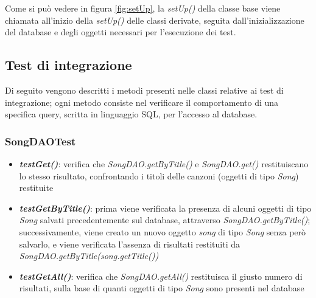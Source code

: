 \documentclass{article}
\begin{document}
  Come si può vedere in figura \ref{fig:setUp}, la \textit{setUp()} della classe base viene chiamata all'inizio della \textit{setUp()} delle classi
  derivate, seguita dall'inizializzazione del database e degli oggetti necessari per l'esecuzione dei test.

  \subsection{Test di integrazione}
  Di seguito vengono descritti i metodi presenti nelle classi relative ai test di integrazione; ogni metodo consiste nel verificare il comportamento di una specifica query, scritta in linguaggio SQL, per l'accesso al database.


  \subsubsection{SongDAOTest}
  \begin{itemize}

    \item \textbf{\textit{testGet()}}: verifica che \textit{SongDAO.getByTitle()} e \textit{SongDAO.get()} restituiscano lo stesso risultato, confrontando i titoli delle canzoni (oggetti di tipo \textit{Song}) restituite

    \item \textbf{\textit{testGetByTitle()}}: prima viene verificata la presenza di alcuni oggetti di tipo \textit{Song} salvati precedentemente sul database, attraverso \textit{SongDAO.getByTitle()}; successivamente, viene creato un nuovo oggetto \textit{song} di tipo \textit{Song} senza però salvarlo, e viene verificata l'assenza di risultati restituiti da \textit{SongDAO.getByTitle(song.getTitle())}

    \item \textbf{\textit{testGetAll()}}: verifica che \textit{SongDAO.getAll()} restituisca il giusto numero di risultati, sulla base di quanti oggetti di tipo \textit{Song} sono presenti nel database

  \end{itemize}
\end{document}
